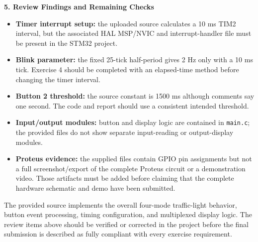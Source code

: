 \textbf{5. Review Findings and Remaining Checks}

\begin{itemize}[leftmargin=1.2cm]
    \item \textbf{Timer interrupt setup:} the uploaded source calculates a 10 ms TIM2 interval, but the associated HAL MSP/NVIC and interrupt-handler file must be present in the STM32 project.
    \item \textbf{Blink parameter:} the fixed 25-tick half-period gives 2 Hz only with a 10 ms tick. Exercise 4 should be completed with an elapsed-time method before changing the timer interval.
    \item \textbf{Button 2 threshold:} the source constant is 1500 ms although comments say one second. The code and report should use a consistent intended threshold.
    \item \textbf{Input/output modules:} button and display logic are contained in \texttt{main.c}; the provided files do not show separate input-reading or output-display modules.
    \item \textbf{Proteus evidence:} the supplied files contain GPIO pin assignments but not a full screenshot/export of the complete Proteus circuit or a demonstration video. Those artifacts must be added before claiming that the complete hardware schematic and demo have been submitted.
\end{itemize}

\begin{resultbox}
The provided source implements the overall four-mode traffic-light behavior, button event processing, timing configuration, and multiplexed display logic. The review items above should be verified or corrected in the project before the final submission is described as fully compliant with every exercise requirement.
\end{resultbox}

